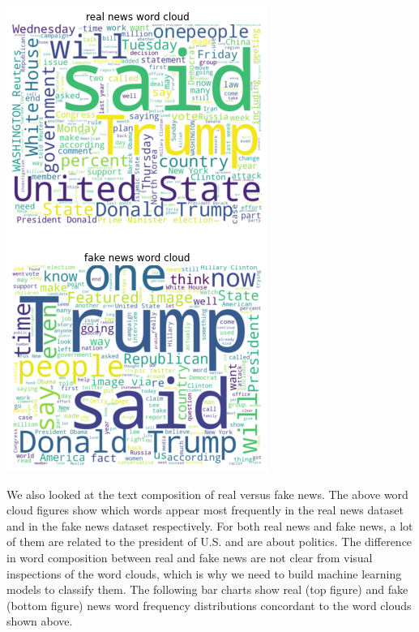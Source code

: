 \documentclass{article}
\begin{document}
\begin{multicols}{2}
\begin{center}
\includegraphics[scale=0.45]{images/wd2.png}
\end{center}

We also looked at the text composition of real versus fake news. The above word cloud figures show which words appear most frequently in the real news dataset and in the fake news dataset respectively. For both real news and fake news, a lot of them are related to the president of U.S. and are about politics. The difference in word composition between real and fake news are not clear from visual inspections of the word clouds, which is why we need to build machine learning models to classify them. The following bar charts show real (top figure) and fake (bottom figure) news word frequency distributions concordant to the word clouds shown above. 


\end{multicols}
\end{document}
